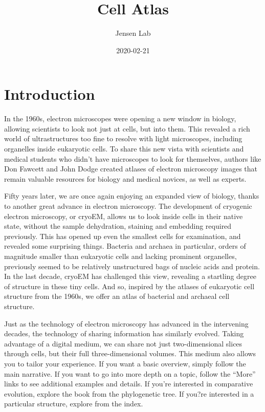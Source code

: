 \documentclass[]{tufte-book}
\title{Cell Atlas}
\author{Jensen Lab}
\date{2020-02-21}
\begin{document}
\maketitle



{
\setcounter{tocdepth}{1}
\tableofcontents
}

\chapter*{Introduction}\label{introduction}

In the 1960s, electron microscopes were opening a new window in biology,
allowing scientists to look not just at cells, but into them. This
revealed a rich world of ultrastructures too fine to resolve with light
microscopes, including organelles inside eukaryotic cells. To share this
new vista with scientists and medical students who didn't have
microscopes to look for themselves, authors like Don Fawcett and John
Dodge created atlases of electron microscopy images that remain valuable
resources for biology and medical novices, as well as experts.

Fifty years later, we are once again enjoying an expanded view of
biology, thanks to another great advance in electron microscopy. The
development of cryogenic electron microscopy, or cryoEM, allows us to
look inside cells in their native state, without the sample dehydration,
staining and embedding required previously. This has opened up even the
smallest cells for examination, and revealed some surprising things.
Bacteria and archaea in particular, orders of magnitude smaller than
eukaryotic cells and lacking prominent organelles, previously seemed to
be relatively unstructured bags of nucleic acids and protein. In the
last decade, cryoEM has challenged this view, revealing a startling
degree of structure in these tiny cells. And so, inspired by the atlases
of eukaryotic cell structure from the 1960s, we offer an atlas of
bacterial and archaeal cell structure.

Just as the technology of electron microscopy has advanced in the
intervening decades, the technology of sharing information has similarly
evolved. Taking advantage of a digital medium, we can share not just
two-dimensional slices through cells, but their full three-dimensional
volumes. This medium also allows you to tailor your experience. If you
want a basic overview, simply follow the main narrative. If you want to
go into more depth on a topic, follow the ``More'' links to see
additional examples and details. If you're interested in comparative
evolution, explore the book from the phylogenetic tree. If you?re
interested in a particular structure, explore from the index.
\end{document}
